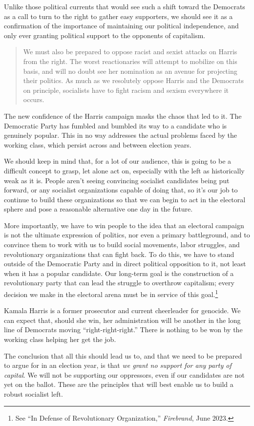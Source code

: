 Unlike those political currents that would see such a shift toward the Democrats as a call to turn to the right to gather easy supporters, we should see it as a confirmation of the importance of maintaining our political independence, and only ever granting political support to the opponents of capitalism.

\blockquote{We must also be prepared to oppose racist and sexist attacks on Harris from the right. The worst reactionaries will attempt to mobilize on this basis, and will no doubt see her nomination as an avenue for projecting their politics. As much as we resolutely oppose Harris and the Democrats on principle, socialists have to fight racism and sexism everywhere it occurs.}

The new confidence of the Harris campaign masks the chaos that led to it. The Democratic Party has fumbled and bumbled its way to a candidate who is genuinely popular. This in no way addresses the actual problems faced by the working class, which persist across and between election years.

We should keep in mind that, for a lot of our audience, this is going to be a difficult concept to grasp, let alone act on, especially with the left as historically weak as it is. People aren't seeing convincing socialist candidates being put forward, or any socialist organizations capable of doing that, so it's our job to continue to build these organizations so that we can begin to act in the electoral sphere and pose a reasonable alternative one day in the future.

More importantly, we have to win people to the idea that an electoral campaign is not the ultimate expression of politics, nor even a primary battleground, and to convince them to work with us to build social movements, labor struggles, and revolutionary organizations that can fight back. To do this, we have to stand outside of the Democratic Party and in direct political opposition to it, not least when it has a popular candidate. Our long-term goal is the construction of a revolutionary party that can lead the struggle to overthrow capitalism; every decision we make in the electoral arena must be in service of this goal.\footnote{See ``In Defense of Revolutionary Organization,'' \emph{Firebrand}, June 2023.}

Kamala Harris is a former prosecutor and current cheerleader for genocide. We can expect that, should she win, her administration will be another in the long line of Democrats moving ``right-right-right.'' There is nothing to be won by the working class helping her get the job.

The conclusion that all this should lead us to, and that we need to be prepared to argue for in an election year, is that \emph{we grant no support for any party of capital}. We will not be supporting our oppressors, even if our candidates are not yet on the ballot. These are the principles that will best enable us to build a robust socialist left.
